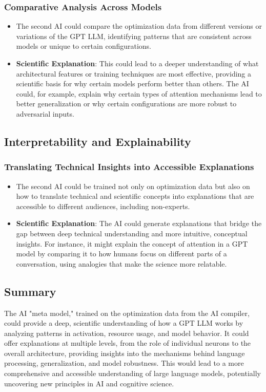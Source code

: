 \documentclass{article}
\begin{document}
\subsubsection{Comparative Analysis Across Models}
\begin{itemize}
    \item The second AI could compare the optimization data from different versions or variations of the GPT LLM, identifying patterns that are consistent across models or unique to certain configurations.
    \item \textbf{Scientific Explanation}: This could lead to a deeper understanding of what architectural features or training techniques are most effective, providing a scientific basis for why certain models perform better than others. The AI could, for example, explain why certain types of attention mechanisms lead to better generalization or why certain configurations are more robust to adversarial inputs.
\end{itemize}

\subsection{Interpretability and Explainability}
\subsubsection{Translating Technical Insights into Accessible Explanations}
\begin{itemize}
    \item The second AI could be trained not only on optimization data but also on how to translate technical and scientific concepts into explanations that are accessible to different audiences, including non-experts.
    \item \textbf{Scientific Explanation}: The AI could generate explanations that bridge the gap between deep technical understanding and more intuitive, conceptual insights. For instance, it might explain the concept of attention in a GPT model by comparing it to how humans focus on different parts of a conversation, using analogies that make the science more relatable.
\end{itemize}

\subsection{Summary}
The AI "meta model," trained on the optimization data from the AI compiler, could provide a deep, scientific understanding of how a GPT LLM works by analyzing patterns in activation, resource usage, and model behavior. It could offer explanations at multiple levels, from the role of individual neurons to the overall architecture, providing insights into the mechanisms behind language processing, generalization, and model robustness. This would lead to a more comprehensive and accessible understanding of large language models, potentially uncovering new principles in AI and cognitive science.
\end{document}
